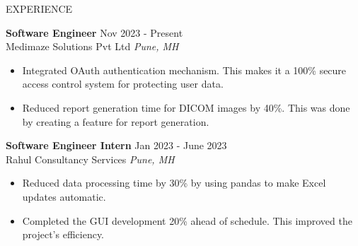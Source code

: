\documentclass{resume} %
\begin{document}
\begin{rSection}{EXPERIENCE}

\textbf{Software Engineer} \hfill Nov 2023 - Present\\
Medimaze Solutions Pvt Ltd \hfill \textit{Pune, MH}
 \begin{itemize}
    \itemsep -3pt {} 
    \item Integrated OAuth authentication mechanism. This makes it a 100\% secure access control system for protecting user data.
    \item Reduced report generation time for DICOM images by 40\%. This was done by creating a feature for report generation. 
 \end{itemize}

 \textbf{Software Engineer Intern} \hfill Jan 2023 - June 2023\\
 Rahul Consultancy Services \hfill \textit{Pune, MH}
 \begin{itemize}
    \itemsep -3pt {} 
     \item Reduced data processing time by 30\%  by using pandas to make Excel updates automatic.
     \item Completed the GUI development 20\% ahead of schedule. This improved the project's efficiency.
 \end{itemize}
 

\end{rSection} 
\end{document}
